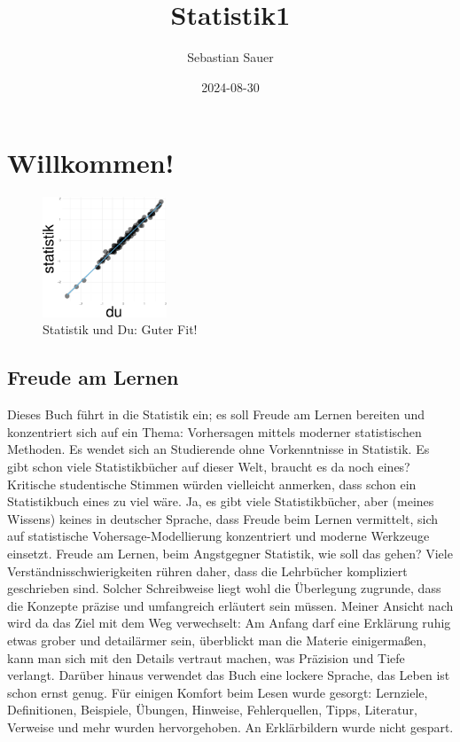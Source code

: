 \documentclass[
  a4paper,
  DIV=11]{scrreprt}
\title{Statistik1}
\author{Sebastian Sauer}
\date{2024-08-30}
\renewcommand*\contentsname{Inhaltsverzeichnis}
\newcommand\contentsname{Inhaltsverzeichnis}
\theoremstyle{definition}
\theoremstyle{definition}
\theoremstyle{definition}
\theoremstyle{remark}
\begin{document}
\maketitle

\renewcommand*\contentsname{Inhaltsverzeichnis}
{
\hypersetup{linkcolor=}
\setcounter{tocdepth}{2}
\tableofcontents
}

\chapter{Willkommen!}\label{willkommen}

\begin{figure}[H]

{\centering \includegraphics[width=0.33\textwidth,height=\textheight]{index_files/figure-pdf/statistik-und-du-guter-fit-1.pdf}

}

\caption{Statistik und Du: Guter Fit!}

\end{figure}%

\section{Freude am Lernen}\label{freude-am-lernen}

Dieses Buch führt in die Statistik ein; es soll Freude am Lernen
bereiten und konzentriert sich auf ein Thema: Vorhersagen mittels
moderner statistischen Methoden. Es wendet sich an Studierende ohne
Vorkenntnisse in Statistik. Es gibt schon viele Statistikbücher auf
dieser Welt, braucht es da noch eines? Kritische studentische Stimmen
würden vielleicht anmerken, dass schon ein Statistikbuch eines zu viel
wäre. Ja, es gibt viele Statistikbücher, aber (meines Wissens) keines in
deutscher Sprache, dass Freude beim Lernen vermittelt, sich auf
statistische Vohersage-Modellierung konzentriert und moderne Werkzeuge
einsetzt. Freude am Lernen, beim Angstgegner Statistik, wie soll das
gehen? Viele Verständnisschwierigkeiten rühren daher, dass die
Lehrbücher kompliziert geschrieben sind. Solcher Schreibweise liegt wohl
die Überlegung zugrunde, dass die Konzepte präzise und umfangreich
erläutert sein müssen. Meiner Ansicht nach wird da das Ziel mit dem Weg
verwechselt: Am Anfang darf eine Erklärung ruhig etwas grober und
detailärmer sein, überblickt man die Materie einigermaßen, kann man sich
mit den Details vertraut machen, was Präzision und Tiefe verlangt.
Darüber hinaus verwendet das Buch eine lockere Sprache, das Leben ist
schon ernst genug. Für einigen Komfort beim Lesen wurde gesorgt:
Lernziele, Definitionen, Beispiele, Übungen, Hinweise, Fehlerquellen,
Tipps, Literatur, Verweise und mehr wurden hervorgehoben. An
Erklärbildern wurde nicht gespart.
\end{document}
